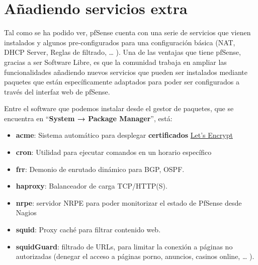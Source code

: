 \chapter{Añadiendo servicios extra}
Tal como se ha podido ver, pfSense cuenta con una serie de servicios que vienen instalados y algunos pre-configurados para una configuración básica (NAT, DHCP Server, Reglas de filtrado, … ). Una de las ventajas que tiene pfSense, gracias a ser Software Libre, es que la comunidad trabaja en ampliar las funcionalidades añadiendo nuevos servicios que pueden ser instalados mediante paquetes que están específicamente adaptados para poder ser configurados a través del interfaz web de pfSense.

Entre el software que podemos instalar desde el gestor de paquetes, que se encuentra en “\textbf{System → Package Manager}”, está:

\begin{itemize}
    \item \textbf{acme}: Sistema automático para desplegar \textbf{certificados} \href{https://letsencrypt.org/es/}{Let's Encrypt}
    \item \textbf{cron}: Utilidad para ejecutar comandos en un horario específico
    \item \textbf{frr}: Demonio de enrutado dinámico para BGP, OSPF.
    \item \textbf{haproxy}: Balanceador de carga TCP/HTTP(S).
    \item \textbf{nrpe}: servidor NRPE para poder monitorizar el estado de PfSense desde Nagios
    \item \textbf{squid}: Proxy caché para filtrar contenido web.
    \item \textbf{squidGuard}: filtrado de URLs, para limitar la conexión a páginas no autorizadas (denegar el acceso a páginas porno, anuncios, casinos online, … ).
\end{itemize}

